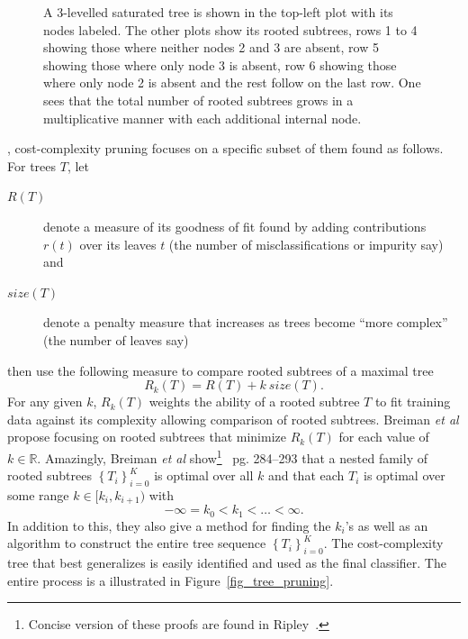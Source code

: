 \begin{figure}
\caption{A 3-levelled saturated tree is shown in the top-left plot with its nodes labeled. The other plots show its rooted subtrees, rows 1 to 4 showing those where neither nodes 2 and 3 are absent, row 5 showing those where only node 3 is absent, row 6 showing those where only node 2 is absent and the rest follow on the last row. One sees that the total number of rooted subtrees grows in a multiplicative manner with each additional internal node.}
\label{fig_rooted_subtrees}
\end{figure}, cost-complexity pruning focuses on a specific subset of them found as follows. For trees $T$, let
\begin{description}
\item[$R(T)$] denote a measure of its goodness of fit found by adding contributions $r(t)$ over its leaves $t$ (the number of misclassifications or impurity say) and
\item[$size(T)$] denote a penalty measure that increases as trees become ``more complex'' (the number of leaves say)
\end{description} 
then use the following measure to compare rooted subtrees of a maximal tree $$R_k(T)=R(T)+k~size(T).$$
For any given $k$, $R_k(T)$ weights the ability of a rooted subtree $T$ to fit training data against its complexity allowing comparison of rooted subtrees. Breiman \emph{et al} propose focusing on rooted subtrees that minimize $R_k(T)$ for each value of $k\in\mathbb{R}$. Amazingly, Breiman \emph{et al} show\footnote{Concise version of these proofs are found in Ripley~\cite{Ripley.96}.}~\cite{cart84-2} pg. 284--293 that a nested family of rooted subtrees $\left\{T_i\right\}_{i=0}^K$ is optimal over all $k$ and that each $T_i$ is optimal over some range $k\in[k_i,k_{i+1})$ with $$-\infty=k_0<k_1<\ldots<\infty.$$ In addition to this, they also give a method for finding the $k_i$'s as well as an algorithm to construct the entire tree sequence $\left\{T_i\right\}_{i=0}^K$. The cost-complexity tree that best generalizes is easily identified and used as the final classifier. The entire process is a illustrated in Figure~\ref{fig_tree_pruning}. 
